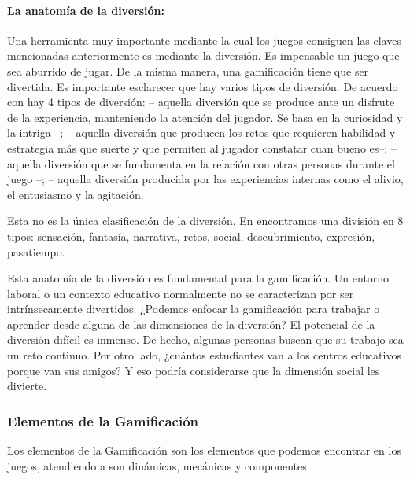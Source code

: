 \paragraph{La anatomía de la diversión: }

Una herramienta muy importante mediante la cual los juegos consiguen las claves mencionadas anteriormente es mediante la diversión.
%
Es impensable un juego que sea aburrido de jugar.
%
De la misma manera, una gamificación tiene que ser divertida.
%
Es importante esclarecer que hay varios tipos de diversión.
%
De acuerdo con \cite{whyweplaygames} hay 4 tipos de diversión: 
%
 -- aquella diversión que se produce ante un disfrute de la experiencia, manteniendo la atención del jugador. Se basa en la curiosidad y la intriga --;
%
\label{kindsoffun}
  -- aquella diversión que producen los retos que requieren habilidad y estrategia más que suerte y que permiten al jugador constatar cuan bueno es--;
%
 -- aquella diversión que se fundamenta en la relación con otras personas durante el juego --;
%
 -- aquella diversión producida por las experiencias internas como el alivio, el entusiasmo y la agitación.

Esta no es la única clasificación de la diversión.
%
En \cite{MDA} encontramos una división en 8 tipos: sensación, fantasía, narrativa, retos, social, descubrimiento, expresión, pasatiempo.
%
\label{AnatomyOfFun}
%

Esta anatomía de la diversión es fundamental para la gamificación.
%
Un entorno laboral o un contexto educativo normalmente no se caracterizan por ser intrínsecamente divertidos.
%
¿Podemos enfocar la gamificación para trabajar o aprender desde alguna de las dimensiones de la diversión? 
%
El potencial de la diversión difícil es inmenso. 
%
De hecho, algunas personas buscan que su trabajo sea un reto continuo.
%
Por otro lado, ¿cuántos estudiantes van a los centros educativos porque van sus amigos?
%
Y eso podría considerarse que la dimensión social les divierte.



\subsubsection{Elementos de la Gamificación}
Los elementos de la Gamificación son los elementos que podemos encontrar en los juegos, atendiendo a \cite{Hunicke04mda:a} son dinámicas, mecánicas y componentes.

